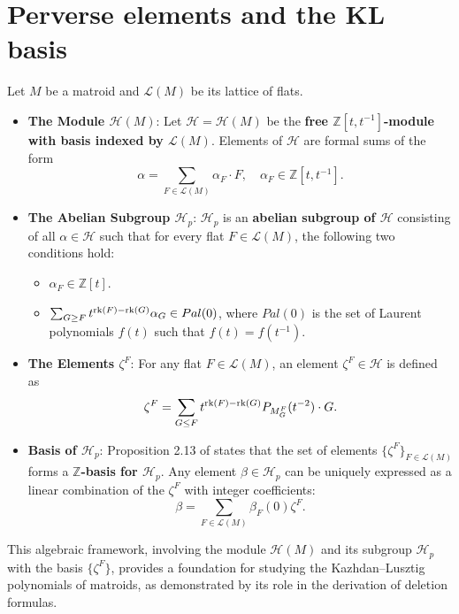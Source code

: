 \documentclass[11pt]{article}
\newcommand{\calL}{\mathcal{L}}
\newcommand{\calH}{\mathcal{H}}
\newcommand{\rank}{\normalfont\text{rk}}
\theoremstyle{remark}
\begin{document}
\section{Perverse elements and the KL basis}
\label{sec:algebraic_framework}

Let $M$ be a matroid and $\calL(M)$ be its lattice of flats.

\begin{itemize}
    \item \textbf{The Module $\calH(M)$}: Let $\calH = \calH(M)$ be the
          \textbf{free $\mathbb{Z}[t, t^{-1}]$-module with basis indexed by $\calL(M)$}.
          Elements of $\calH$ are formal sums of the form
          \[
              \alpha = \sum_{F \in \calL(M)} \alpha_F \cdot F, \quad \alpha_F \in \mathbb{Z}
              [t, t^{-1}].
          \]

    \item \textbf{The Abelian Subgroup $\calH_p$}: $\calH_p$ is an
          \textbf{abelian subgroup of $\calH$} consisting of all $\alpha \in \calH$
          such that for every flat $F \in \calL(M)$, the following two conditions hold:
          \begin{itemize}
              \item[i.] $\alpha_F \in \mathbb{Z}[t]$.
              \item[ii.] $\sum_{G \geq F} t^{\rank(F) - \rank(G)} \alpha_G \in Pal(0)$, where $Pal(0)$ is the set of Laurent polynomials $f(t)$ such that $f(t) = f(t^{-1})$.
          \end{itemize}

    \item \textbf{The Elements $\zeta^F$}: For any flat $F \in \calL(M)$, an element
          $\zeta^F \in \calH$ is defined as
          \[
              \zeta^F = \sum_{G \leq F} t^{\rank(F) - \rank(G)} P_{M_G^F}(t^{-2}) \cdot G.
          \]
    \item \textbf{Basis of $\calH_p$}: Proposition 2.13 of \cite{Bra19} states that the set of elements
          $\{\zeta^F\}_{F \in \calL(M)}$ forms a \textbf{$\mathbb{Z}$-basis for $\calH_p$}.
          Any element $\beta \in \calH_p$ can be uniquely expressed as a linear combination of
          the $\zeta^F$ with integer coefficients:
          \[
              \beta = \sum_{F \in \calL(M)} \beta_F(0) \zeta^F.
          \]
\end{itemize}

This algebraic framework, involving the module $\calH(M)$ and its subgroup $\calH_p$ with the basis $\{\zeta^F\}$, provides a foundation for studying the Kazhdan–Lusztig polynomials of matroids, as demonstrated by its role in the derivation of deletion formulas.
\end{document}
